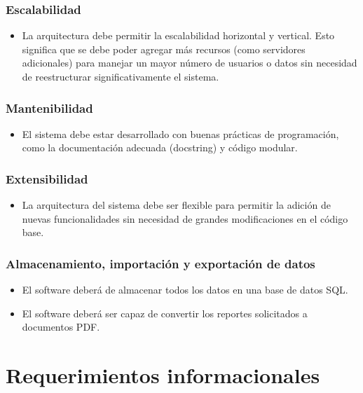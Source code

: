\documentclass{report}
\begin{document}
    \subsubsection*{Escalabilidad}
    \begin{itemize}
        \item La arquitectura debe permitir la escalabilidad horizontal y vertical. Esto significa que se debe poder 
        agregar más recursos (como servidores adicionales) para manejar un mayor número de usuarios o datos sin 
        necesidad de reestructurar significativamente el sistema.
    \end{itemize}

    \subsubsection*{Mantenibilidad}
    \begin{itemize}
        \item El sistema debe estar desarrollado con buenas prácticas de programación, como la documentación adecuada 
        (docstring) y código modular.
    \end{itemize}

    \subsubsection*{Extensibilidad}
    \begin{itemize}
        \item La arquitectura del sistema debe ser flexible para permitir la adición de nuevas funcionalidades sin 
        necesidad de grandes modificaciones en el código base.
    \end{itemize}

    \subsubsection*{Almacenamiento, importación y exportación de datos}
    \begin{itemize}
        \item El software deberá de almacenar todos los datos en una base de datos SQL.
        \item El software deberá ser capaz de convertir los reportes solicitados a documentos PDF.
    \end{itemize}

    \section*{Requerimientos informacionales}
\end{document}
